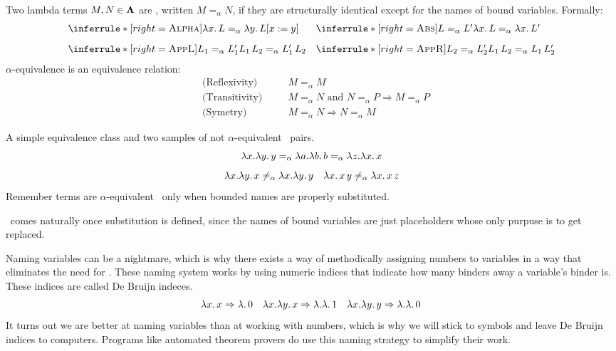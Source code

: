 \begin{definition} Two lambda terms \( M, N \in \mathbf{\Lambda} \) are \aequivlt, written \( M =_\alpha N \), if they are structurally identical except for the names of bound variables.
  Formally:
  \[
    \begin{array}{@{}l@{\quad}l@{}}
      \inferrule*[right=\textsc{Alpha}]
      { }
      { \lam{x}{L} =_\alpha \la y . \, L \subst{x}{y} }
      &
        \inferrule*[right=\textsc{Abs}]
        { L =_\alpha L' }
        { \lam{x}{L} =_\alpha \lam{x}{L'} } \\[2ex]
      \inferrule*[right=\textsc{AppL}]
      { L_1 =_\alpha L_1' }
      { L_1\,L_2 =_\alpha L_1'\,L_2 }
      &
        \inferrule*[right=\textsc{AppR}]
        { L_2 =_\alpha L_2' }
        { L_1\,L_2 =_\alpha L_1\,L_2' }
    \end{array}
  \]
  $\alpha$-equivalence is an equivalence relation:
  \[
    \begin{aligned}
      &\text{(Reflexivity)} \quad && M =_\alpha M \\
      &\text{(Transitivity)} \quad && M =_\alpha N \text{ and } N =_\alpha P \Rightarrow M =_\alpha P \\
      &\text{(Symetry)} \quad && M =_\alpha N \Rightarrow N =_\alpha M
    \end{aligned}
  \]
\end{definition}
\begin{example} A simple equivalence class and two samples of not $\alpha$-equivalent \ pairs.
  \[
    \lambda x.\lambda y. \, y =_\alpha \lambda a.\lambda b. \, b =_\alpha \lambda z.\lambda x. \, x
  \]
  \[
    \lambda x. \lambda y. \, x \not=_\alpha \lambda x. \lambda y. \, y \quad \lambda x. \, x \, y \not=_\alpha \lambda x. \, x \, z 
  \]
  Remember terms are $\alpha$-equivalent \ only when bounded names are properly substituted.
\end{example}
\begin{remark}
  \aequiv \ comes naturally once substitution is defined, since the names of bound variables are just placeholders whose only purpuse is to get replaced.
\end{remark}
Naming variables can be a nightmare, which is why there exists a way of methodically assigning numbers to variables in a way that eliminates the need for \aequiv. These naming system works by using numeric indices that indicate how many binders away a variable’s binder is. These indices are called De Bruijn indeces.
\[
  \lambda x.\, x \Rightarrow \lambda.\, 0 \quad \lambda x. \lambda y.\, x \Rightarrow \lambda. \lambda.\, 1 \quad \lambda x. \lambda y.\, y \Rightarrow \lambda. \lambda. \, 0\,
\]
It turns out we are better at naming variables than at working with numbers, which is why we will stick to symbols and leave De Bruijn indices to computers. Programs like automated theorem provers do use this naming strategy to simplify their work.

